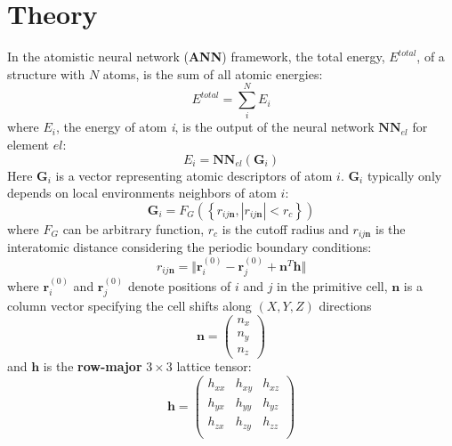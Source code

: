 \documentclass[prb,preprint]{revtex4-2}
\begin{document}
% 
%
\section{Theory}
\label{section:theory}

\newcommand{\rijn}{r_{ij\mathbf{n}}}

In the atomistic neural network (\textbf{ANN}) framework, the total energy, 
$E^{total}$, of a structure with $N$ atoms, is the sum of all atomic energies:
\begin{equation}
\label{eq:general_e_total}
E^{total} = \sum_{i}^{N}{E_i}
\end{equation}
where $E_{i}$, the energy of atom \textit{i}, is the output of the neural 
network $\mathbf{NN}_{el}$ for element $el$:
\begin{equation}
E_i = \mathbf{NN}_{el}\left( \mathbf{G}_i \right)
\end{equation} 
Here $\mathbf{G}_i$ is a vector representing atomic descriptors of atom $i$. 
$\mathbf{G}_i$ typically only depends on local environments \textemdash 
neighbors \textemdash of atom $i$:
\begin{equation}
\mathbf{G}_i = F_G(\left\{ \rijn, |\rijn| < r_c\right\} )
\end{equation}
where $F_G$ can be arbitrary function, $r_c$ is the cutoff radius and $\rijn$ is 
the interatomic distance considering the periodic boundary conditions: 
\begin{equation}
    \label{eq:rijn}
    \rijn = \Vert \mathbf{r}_i^{(0)} - \mathbf{r}_j^{(0)} + 
    \mathbf{n}^T \mathbf{h} \Vert
\end{equation}
where $\mathbf{r}_i^{(0)}$ and $\mathbf{r}_j^{(0)}$ denote positions of $i$ and 
$j$ in the primitive cell, $\mathbf{n}$ is a column vector specifying the cell 
shifts along $(X,Y,Z)$ directions 
\begin{equation}
    \label{eq:ij_shift}
    \mathbf{n} = \begin{pmatrix}
        n_x \\
        n_y \\
        n_z
    \end{pmatrix}
\end{equation}
and $\mathbf{h}$ is the \textbf{row-major} $3 \times 3$ lattice tensor:
\begin{equation}
    \label{eq:lattice}
    \mathbf{h} = \begin{pmatrix}
        h_{xx} & h_{xy} & h_{xz} \\
        h_{yx} & h_{yy} & h_{yz} \\
        h_{zx} & h_{zy} & h_{zz} \\
    \end{pmatrix}
\end{equation}
\end{document}

